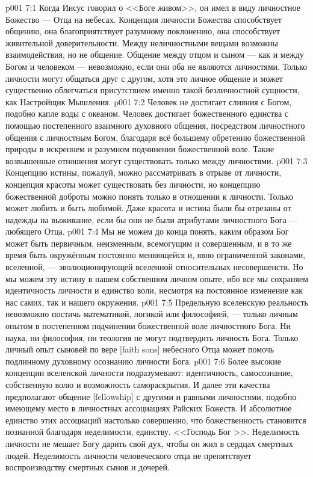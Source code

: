 \vs p001 7:1 Когда Иисус говорил о <<Боге живом>>, он имел в виду личностное Божество --- Отца на небесах. Концепция личности Божества способствует общению, она благоприятствует разумному поклонению, она способствует живительной доверительности. Между неличностными вещами возможны взаимодействия, но не общение. Общение между отцом и сыном --- как и между Богом и человеком --- невозможно, если они оба не являются личностями. Только личности могут общаться друг с другом, хотя это личное общение и может существенно облегчаться присутствием именно такой безличностной сущности, как Настройщик Мышления.
\vs p001 7:2 Человек не достигает слияния с Богом, подобно капле воды с океаном. Человек достигает божественного единства с помощью постепенного взаимного духовного общения, посредством личностного общения с личностным Богом, благодаря всё большему обретению божественной природы в искреннем и разумном подчинении божественной воле. Такие возвышенные отношения могут существовать только между личностями.
\vs p001 7:3 \pc Концепцию истины, пожалуй, можно рассматривать в отрыве от личности, концепция красоты может существовать без личности, но концепцию божественной доброты можно понять только в отношении к личности. Только  может любить и быть любимой. Даже красота и истина были бы отрезаны от надежды на выживание, если бы они не были атрибутами личностного Бога --- любящего Отца.
\vs p001 7:4 \pc Мы не можем до конца понять, каким образом Бог может быть первичным, неизменным, всемогущим и совершенным, и в то же время быть окружённым постоянно меняющейся и, явно ограниченной законами, вселенной, --- эволюционирующей вселенной относительных несовершенств. Но мы можем  эту истину в нашем собственном личном опыте, ибо все мы сохраняем идентичность личности и единство воли, несмотря на постоянное изменение как нас самих, так и нашего окружения.
\vs p001 7:5 Предельную вселенскую реальность невозможно постичь математикой, логикой или философией, --- только личным опытом в постепенном подчинении божественной воле личностного Бога. Ни наука, ни философия, ни теология не могут подтвердить личность Бога. Только личный опыт сыновей по вере [faith sons] небесного Отца может помочь подлинному духовному осознанию личности Бога.
\vs p001 7:6 \pc Более высокие концепции вселенской личности подразумевают: идентичность, самосознание, собственную волю и возможность самораскрытия. И далее эти качества предполагают общение [fellowship] с другими и равными личностями, подобно имеющему место в личностных ассоциациях Райских Божеств. И абсолютное единство этих ассоциаций настолько совершенно, что божественность становится познанной благодаря неделимости, единству. <<Господь Бог >>. Неделимость личности не мешает Богу дарить свой дух, чтобы он жил в сердцах смертных людей. Неделимость личности человеческого отца не препятствует воспроизводству смертных сынов и дочерей.
